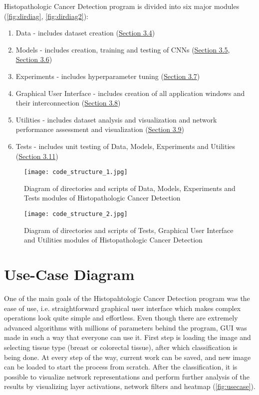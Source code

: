 Histopathologic Cancer Detection program is divided into six major modules (\textcolor{red}{\autoref{fig:dirdiag}}, \textcolor{red}{\autoref{fig:dirdiag2}}):
\begin{enumerate}
	\itemsep 0em
	\item Data - includes dataset creation (\textcolor{red}{\hyperref[createdata]{Section 3.4}})
	\item Models - includes creation, training and testing of CNNs (\textcolor{red}{\hyperref[cnn]{Section 3.5}\textcolor{black}{,} \\ \hyperref[vgg19]{Section 3.6}})
	\item Experiments - includes hyperparameter tuning (\textcolor{red}{\hyperref[exp]{Section 3.7}})
	\item Graphical User Interface - includes creation of all application windows and their interconnection (\textcolor{red}{\hyperref[gui]{Section 3.8}})
	\item Utilities - includes dataset analysis and visualization and network performance assessment and visualization (\textcolor{red}{\hyperref[utils]{Section 3.9}})
	\item Tests - includes unit testing of Data, Models, Experiments and Utilities (\textcolor{red}{\hyperref[tests]{Section 3.11}})
\end{enumerate}

\begin{figure}[h]
	\centering
	\texttt{[image: code\_structure\_1.jpg]}
	\caption{Diagram of directories and scripts of Data, Models, Experiments and Tests modules of Histopathologic Cancer Detection}
	\label{fig:dirdiag}
\end{figure}

\clearpage

\begin{figure}[h]
	\centering
	\texttt{[image: code\_structure\_2.jpg]}
	\caption{Diagram of directories and scripts of Tests, Graphical User Interface and Utilities modules of Histopathologic Cancer Detection}
	\label{fig:dirdiag2}
\end{figure}

\section{Use-Case Diagram}

One of the main goals of the Histopahtologic Cancer Detection program was the ease of use, i.e. straightforward graphical user interface which makes complex operations look quite simple and effortless. Even though there are extremely advanced algorithms with millions of parameters behind the program, GUI was made in such a way that everyone can use it. 
First step is loading the image and selecting tissue type (breast or colorectal tissue), after which classification is being done. At every step of the way, current work can be saved, and new image can be loaded to start the process from scratch. After the classification, it is possible to visualize network representations and perform further analysis of the results by visualizing layer activations, network filters and heatmap (\textcolor{red}{\autoref{fig:usecase}}).

